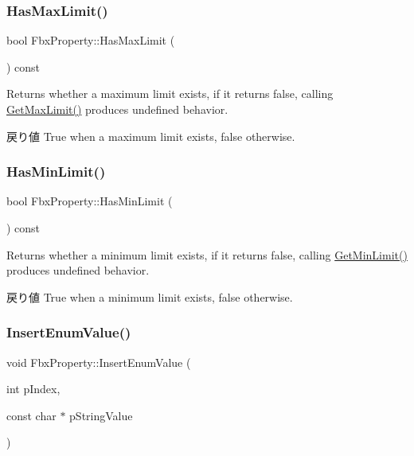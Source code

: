\subsubsection{\texorpdfstring{Has\+Max\+Limit()}{HasMaxLimit()}}
{\footnotesize\ttfamily bool Fbx\+Property\+::\+Has\+Max\+Limit (\begin{DoxyParamCaption}{ }\end{DoxyParamCaption}) const}

Returns whether a maximum limit exists, if it returns false, calling \hyperlink{class_fbx_property_a1cdf4161465d3b988b23b9fe05fa22b4}{Get\+Max\+Limit()} produces undefined behavior. \begin{DoxyReturn}{戻り値}
{\ttfamily True} when a maximum limit exists, {\ttfamily false} otherwise. 
\end{DoxyReturn}
\mbox{\label{class_fbx_property_ae2c3f0688ecfbed568feb2dbe33967c3}} 
\subsubsection{\texorpdfstring{Has\+Min\+Limit()}{HasMinLimit()}}
{\footnotesize\ttfamily bool Fbx\+Property\+::\+Has\+Min\+Limit (\begin{DoxyParamCaption}{ }\end{DoxyParamCaption}) const}

Returns whether a minimum limit exists, if it returns false, calling \hyperlink{class_fbx_property_abdc5ccbaea5c1e32d7b1ccfa3fd826af}{Get\+Min\+Limit()} produces undefined behavior. \begin{DoxyReturn}{戻り値}
{\ttfamily True} when a minimum limit exists, {\ttfamily false} otherwise. 
\end{DoxyReturn}
\mbox{\label{class_fbx_property_a3e03482059d70c4e86314f8922ae8d22}} 
\subsubsection{\texorpdfstring{Insert\+Enum\+Value()}{InsertEnumValue()}}
{\footnotesize\ttfamily void Fbx\+Property\+::\+Insert\+Enum\+Value (\begin{DoxyParamCaption}\item[{int}]{p\+Index,  }\item[{const char $\ast$}]{p\+String\+Value }\end{DoxyParamCaption})}

